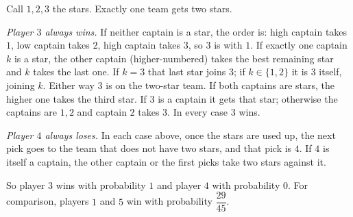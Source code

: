 Call $1,2,3$ the stars. Exactly one team gets two stars.

\emph{Player $3$ always wins.} If neither captain is a star, the order is: high captain takes $1$, low captain takes $2$, high captain takes $3$, so $3$ is with $1$. If exactly one captain $k$ is a star, the other captain (higher-numbered) takes the best remaining star and $k$ takes the last one. If $k=3$ that last star joins $3$; if $k\in\{1,2\}$ it is $3$ itself, joining $k$. Either way $3$ is on the two-star team. If both captains are stars, the higher one takes the third star. If $3$ is a captain it gets that star; otherwise the captains are $1,2$ and captain $2$ takes $3$. In every case $3$ wins.

\emph{Player $4$ always loses.} In each case above, once the stars are used up, the next pick goes to the team that does not have two stars, and that pick is $4$. If $4$ is itself a captain, the other captain or the first picks take two stars against it.

So player $\boxed{3}$ wins with probability $1$ and player $\boxed{4}$ with probability $0$. For comparison, players $1$ and $5$ win with probability $\dfrac{29}{45}$.
